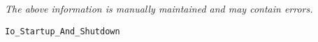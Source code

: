 \label{pkg:io\_startup\_and\_shutdown}

{\tiny \it The above information is manually maintained and may contain errors.}
\begin{verbatim}
Io_Startup_And_Shutdown
\end{verbatim}
